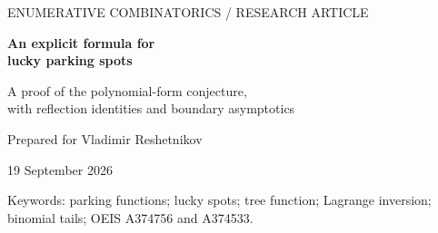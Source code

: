 \documentclass[11pt,letterpaper]{article}
\numberwithin{equation}{section}
\theoremstyle{definition}
\begin{document}
\begin{titlepage}
\vspace*{0.5in}
{\small\sffamily\color{Olive}ENUMERATIVE COMBINATORICS \quad / \quad RESEARCH ARTICLE\par}
\vspace{0.3in}
{\Huge\bfseries\color{Ink}An explicit formula for\\[4pt]lucky parking spots\par}
\vspace{0.2in}
{\Large A proof of the polynomial-form conjecture,\\
with reflection identities and boundary asymptotics\par}
\vspace{0.25in}
{\large Prepared for Vladimir Reshetnikov\par}
{19 September 2026\par}
\vspace{0.35in}
\begin{abstract}
Let $C_{n,j}$ count ordinary parking functions on $n$ spots in which spot $j$
is occupied by a car that preferred that spot. We prove the explicit formula
\[
 C_{n,j}=\frac{j+1}{2j}(n+1)^{n-1}
 -\frac{1}{2j}\sum_{k=0}^{j-2}\binom nk j^k(n-j+1)^{n-1-k},
 \qquad 1\le j\le n,
\]
with the sum empty when $j=1$. Factoring the sum proves Conjecture 13 of
Butler, Hadaway, Lenius, Martens, and Moats, including the assertion that the
correction polynomial has degree exactly $j-2$. The leading coefficient is
$\frac1{2j}\sum_{k=0}^{j-2}j^k/k!$. The proof uses a last-arrival decomposition,
a bivariate exponential generating function, and two explicit applications
of Lagrange inversion.

The formula also gives an exact reflection law, formulas for every fixed
distance from the right endpoint, and in particular
\[
 C_{n,n-1}=\frac{(n+1)^{n-1}+(5n-1)(n-1)^{n-2}}4.
\]
A binomial-probability interpretation gives both edge limits in terms of
Poisson tails and proves convergence to $1/2$ whenever both distances to the
ends tend to infinity. Further consequences include a reciprocity identity
for the correction polynomials, a convergent fixed-column expansion in
$1/n$, and an exact central-column formula. All proofs are given in ordinary
mathematical language. The accompanying standard-library Python program
performs exact, independently organized checks and regenerates the data.
\end{abstract}
\vfill
{\small\color{Olive}Keywords: parking functions; lucky spots; tree function;
Lagrange inversion; binomial tails; OEIS A374756 and A374533.\par}
\end{titlepage}
\end{document}
